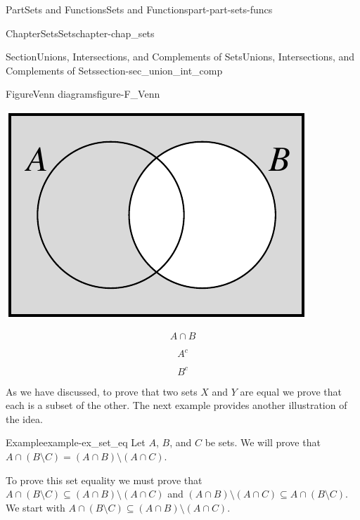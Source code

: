 \documentclass[oneside,10pt,]{book}
\numberwithin{equation}{chapter}
\begin{document}
\begin{partptx}{Part}{Sets and Functions}{}{Sets and Functions}{}{}{part-part-sets-funcs}
\begin{chapterptx}{Chapter}{Sets}{}{Sets}{}{}{chapter-chap_sets}
\begin{sectionptx}{Section}{Unions, Intersections, and Complements of Sets}{}{Unions, Intersections, and Complements of Sets}{}{}{section-sec_union_int_comp}
\begin{figureptx}{Figure}{Venn diagrams}{figure-F_Venn}{}
\begin{sidebyside}{3}{0}{0}{0}
\begin{sbspanel}{0.333333333333333}
\includegraphics[width=\linewidth]{external/Venn_Diagram_B_complement.pdf}
\end{sbspanel}%
\end{sidebyside}%
\begin{sidebyside}{3}{0}{0}{0}%
\begin{sbspanel}{0.333333333333333}%
%
\begin{equation*}
A \cap B
\end{equation*}
%
\end{sbspanel}%
\begin{sbspanel}{0.333333333333333}%
\par
%
\begin{equation*}
A^{c}
\end{equation*}
%
\end{sbspanel}%
\begin{sbspanel}{0.333333333333333}%
\par
%
\begin{equation*}
B^{c}
\end{equation*}
%
\end{sbspanel}%
\end{sidebyside}%
\tcblower
\end{figureptx}%
As we have discussed, to prove that two sets \(X\) and \(Y\) are equal we prove that each is a subset of the other. The next example provides another illustration of the idea.%
\begin{example}{Example}{}{example-ex_set_eq}%
Let \(A\), \(B\), and \(C\) be sets. We will prove that \(A \cap (B \setminus C) = (A \cap B) \setminus (A \cap C)\).%
\par
To prove this set equality we must prove that \(A \cap (B \setminus C) \subseteq (A \cap B) \setminus (A \cap C)\) and \((A \cap B) \setminus (A \cap C) \subseteq A \cap (B \setminus C)\). We start with \(A \cap (B \setminus C) \subseteq (A \cap B) \setminus (A \cap C)\).%

\end{example}
\end{sectionptx}
\end{chapterptx}
\end{partptx}
\end{document}
